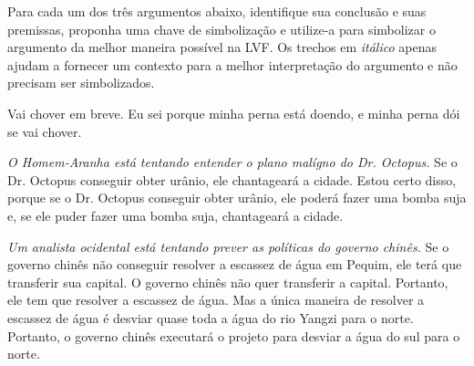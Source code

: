 \problempart
Para cada um dos três argumentos abaixo, identifique sua conclusão e suas premissas, proponha uma chave de simbolização e utilize-a para simbolizar o  argumento da melhor maneira possível na LVF.
Os trechos em \emph{itálico} apenas ajudam a fornecer um contexto para a melhor interpretação do argumento e não precisam ser simbolizados.
\begin{earg}
\item Vai chover em breve. Eu sei porque minha perna está doendo, e minha perna dói se vai chover.



\item  \emph{O Homem-Aranha está tentando entender o plano malígno do Dr. Octopus.} Se o Dr. Octopus conseguir obter urânio, ele chantageará a cidade. Estou certo disso, porque se o Dr. Octopus conseguir obter urânio, ele poderá fazer uma bomba suja e, se ele puder fazer uma bomba suja, chantageará a cidade.



\item \emph{Um analista ocidental está tentando prever as políticas do governo chinês.} Se o governo chinês não conseguir resolver a escassez de água em Pequim, ele terá que transferir sua capital. O governo chinês não quer transferir a capital. Portanto, ele tem que resolver a escassez de água. Mas a única maneira de resolver a escassez de água é desviar quase toda a água do rio Yangzi para o norte. Portanto, o governo chinês executará o projeto para desviar a água do sul para o norte.       





\end{earg}

